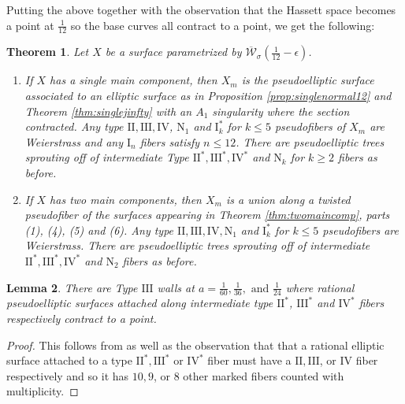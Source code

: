 \documentclass[11pt]{amsart}
\newtheorem{theorem}{Theorem}[section]
\newtheorem{lemma}[theorem]{Lemma}
\theoremstyle{definition}
\theoremstyle{remark}
\newcommand{\ktwelvee}{\overline{\mathcal{W}}_\sigma({\frac{1}{12}-\epsilon})}
\begin{document}
	Putting the above together with the observation that the Hassett space becomes a point at $\frac{1}{12}$ so the base curves all contract to a point, we get the following:
	
	\begin{theorem}\label{thm:ktwelve}  Let $X$ be a surface parametrized by $\ktwelvee$.
		
		\begin{enumerate}
			\item If $X$ has a single main component, then $X_m$ is the pseudoelliptic surface associated to an elliptic surface as in Proposition \ref{prop:singlenormal12} and Theorem \ref{thm:singlejinfty} with an $A_1$ singularity where the section contracted. Any type $\mathrm{II}, \mathrm{III}, \mathrm{IV}$, $\mathrm{N}_1$ and $\mathrm{I}_k^*$ for $k \le 5$ pseudofibers of $X_m$ are Weierstrass and any $\mathrm{I}_n$ fibers satisfy $n \le 12$. There are pseudoelliptic trees sprouting off of intermediate Type $\mathrm{II}^*, \mathrm{III}^*, \mathrm{IV}^*$ and $\mathrm{N}_k$ for $k \geq 2$ fibers as before. 
			
			\item If $X$ has two main components, then $X_m$ is a union along a twisted pseudofiber of the surfaces appearing in Theorem \ref{thm:twomaincomp}, parts (1), (4), (5) and (6). Any type $\mathrm{II}, \mathrm{III}, \mathrm{IV}, \mathrm{N}_1$ and $\mathrm{I}_k^*$ for $k \le 5$ pseudofibers are Weierstrass. There are pseudoelliptic trees sprouting off of intermediate $\mathrm{II}^*, \mathrm{III}^*, \mathrm{IV}^*$ and $\mathrm{N}_2$ fibers as before. 
		\end{enumerate}
		
	\end{theorem} 
	
	
	\begin{lemma} There are Type $\mathrm{III}$ walls at
		$
		a = \frac{1}{60}, \frac{1}{36}, \text{ and } \frac{1}{24}
		$
		where rational pseudoelliptic surfaces attached along intermediate type $\mathrm{II}^*$, $\mathrm{III}^*$ and $\mathrm{IV}^*$ fibers respectively contract to a point. \end{lemma} 
	
	\begin{proof} This follows from \cite[Theorem 6.3]{master} as well as the observation that that a rational elliptic surface attached to a type $\mathrm{II}^*, \mathrm{III}^*$ or $\mathrm{IV}^*$ fiber must have a $\mathrm{II}, \mathrm{III}$, or $\mathrm{IV}$ fiber respectively and so it has $10,9$, or $8$ other marked fibers counted with multiplicity. \end{proof}
	
\end{document}
